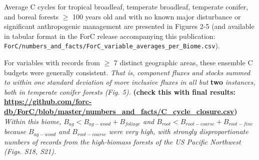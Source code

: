 \documentclass[
]{article}
\begin{document}
Average C cycles for tropical broadleaf, temperate broadleaf, temperate
conifer, and boreal forests \(\ge\) 100 years old and with no known
major disturbance or significant anthropogenic management are presented
in Figures 2-5 (and available in tabular format in the ForC release
accompanying this publication:
\texttt{ForC/numbers\_and\_facts/ForC\_variable\_averages\_per\_Biome.csv}).

For variables with records from \(\ge\) 7 distinct geographic areas,
these ensemble C budgets were generally consistent. \emph{That is,
component fluxes and stocks summed to within one standard deviation of
more inclusive fluxes in all but} \textbf{two} \emph{instances, both in
temperate conifer forests (Fig. 5).} \textbf{(check this with final
results:
\url{https://github.com/forc-db/ForC/blob/master/numbers_and_facts/C_cycle_closure.csv})
} \emph{Within this biome, \(B_{ag}<B_{ag-wood}+B_{foliage}\) and
\(B_{root}<B_{root-coarse}+B_{root-fine}\) because \(B_{ag-wood}\) and
\(B_{root-coarse}\) were very high, with strongly disproportionate
numbers of records from the high-biomass forests of the US Pacific
Northwest (Figs. S18, S21).}
\end{document}
